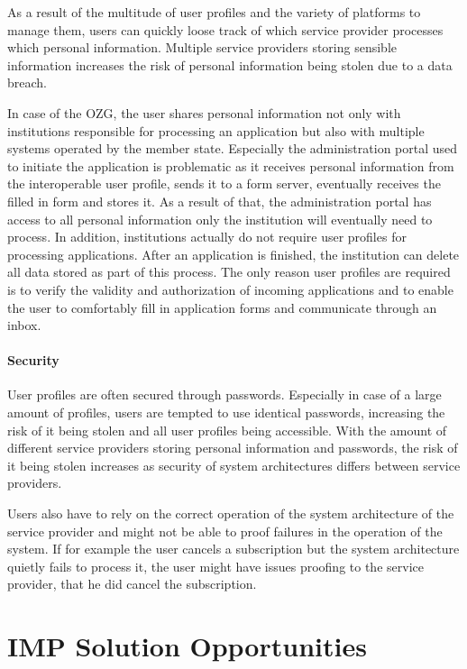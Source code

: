 As a result of the multitude of user profiles and the variety of platforms to manage them, users can quickly loose track of which service provider processes which personal information. Multiple service providers storing sensible information increases the risk of personal information being stolen due to a data breach.


In case of the OZG, the user shares personal information not only with institutions responsible for processing an application but also with multiple systems operated by the member state. Especially the administration portal used to initiate the application is problematic as it receives personal information from the interoperable user profile, sends it to a form server, eventually receives the filled in form and stores it. As a result of that, the administration portal has access to all personal information only the institution will eventually need to process. In addition, institutions actually do not require user profiles for processing applications. After an application is finished, the institution can delete all data stored as part of this process. The only reason user profiles are required is to verify the validity and authorization of incoming applications and to enable the user to comfortably fill in application forms and communicate through an inbox. 

\paragraph{Security}

User profiles are often secured through passwords. Especially in case of a large amount of profiles, users are tempted to use identical passwords, increasing the risk of it being stolen and all user profiles being accessible. With the amount of different service providers storing personal information and passwords, the risk of it being stolen increases as security of system architectures differs between service providers.

Users also have to rely on the correct operation of the system architecture of the service provider and might not be able to proof failures in the operation of the system. If for example the user cancels a subscription but the system architecture quietly fails to process it, the user might have issues proofing to the service provider, that he did cancel the subscription.


\section{IMP Solution Opportunities} \label{section:imp_solution_opportunities}


